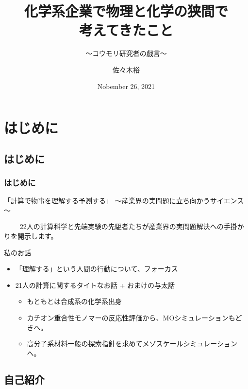\documentclass[12pt, dvipdfmx]{beamer}
\title
{化学系企業で物理と化学の狭間で\\考えてきたこと}
\subtitle{～コウモリ研究者の戯言～}
\author[東亞合成　佐々木]{佐々木裕}
\institute[東亞合成]{東亞合成}
\date{Nobember 26, 2021}
\begin{document}
\begin{frame}\frametitle{}
	\titlepage
\end{frame}

\section{はじめに}
\subsection{はじめに}
\begin{frame}
    \frametitle{はじめに}
    \begin{block}{「計算で物事を理解する予測する」}
        ～産業界の実問題に立ち向かうサイエンス～

　　    22人の計算科学と先端実験の先駆者たちが産業界の実問題解決への手掛かりを開示します。
    \end{block}
    
    \begin{exampleblock}{私のお話}
        \begin{itemize}
            \item 「理解する」という人間の行動について、フォーカス
            \item 21人の計算に関するタイトなお話 + \alert{おまけの与太話}
            \begin{itemize}
                \item もともとは合成系の化学系出身
                \item カチオン重合性モノマーの反応性評価から、MOシミュレーションもどきへ。
                \item 高分子系材料一般の探索指針を求めてメゾスケールシミュレーションへ。
            \end{itemize}
        \end{itemize}
    \end{exampleblock}
\end{frame}

\subsection{自己紹介}
\end{document}
